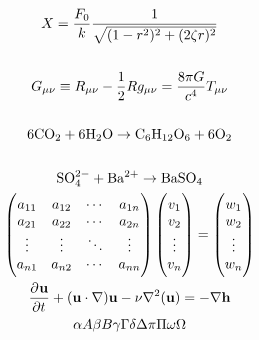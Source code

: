 \documentclass[a4paper,12pt,notitlepage]{article}
\begin{document}
\begin{gather*}
	X = \dfrac{F_0}{k} \dfrac{1}{\sqrt{(1-r^2)^2+(2\zeta r)^2}} \\ \\
	G_{\mu \nu} \equiv R_{\mu \nu} - \dfrac{1}{2} Rg_{\mu \nu} = \dfrac{8\pi G}{c^4} T_{\mu \nu} \\ \\
	\mathrm{6CO_2 + 6H_2O} \rightarrow \mathrm{C_6H_{12}O_6 + 6O_2} \\ \\ 
	\mathrm{SO_4^{2-} + Ba^{2+}} \rightarrow \mathrm{BaSO_4} \\
	\begin{pmatrix}
		a_{11} & a_{12} & \cdots & a_{1n} \\
		a_{21} & a_{22} & \cdots & a_{2n} \\
		\vdots & \vdots & \ddots & \vdots \\
		a_{n1} & a_{n2} & \cdots & a_{nn} \\
	\end{pmatrix}
	\begin{pmatrix}
		v_1 \\ v_2 \\ \vdots \\ v_n
	\end{pmatrix}
	=
	\begin{pmatrix}
		w_1 \\ w_2 \\ \vdots \\ w_n
	\end{pmatrix} \\
	\dpd{\mathbf{u}}{t} + (\mathbf{u} \cdot \nabla)\mathbf{u} - \nu \nabla^2(\mathbf{u}) = -\nabla \mathbf{h} \\
	\alpha A \beta B \gamma \Gamma \delta \Delta \pi \Pi \omega \Omega 
\end{gather*}
\end{document}
